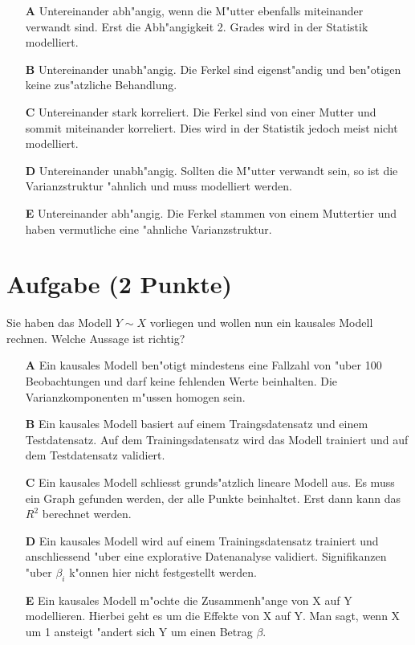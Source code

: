 \documentclass[a4paper, 9pt]{scrartcl}\usepackage[]{graphicx}\usepackage[]{xcolor}
\begin{document}
\begin{enumerate}
\item [\textbf{A} \msquare] Untereinander abh{"a}ngig, wenn die M{"u}tter ebenfalls miteinander verwandt sind. Erst die Abh{"a}ngigkeit 2. Grades wird in der Statistik modelliert.
\item [\textbf{B} \msquare] Untereinander unabh{"a}ngig. Die Ferkel sind eigenst{"a}ndig und ben{"o}tigen keine zus{"a}tzliche Behandlung.
\item [\textbf{C} \msquare] Untereinander stark korreliert. Die Ferkel sind von einer Mutter und sommit miteinander korreliert. Dies wird in der Statistik jedoch meist nicht modelliert.
\item [\textbf{D} \msquare] Untereinander unabh{"a}ngig. Sollten die M{"u}tter verwandt sein, so ist die Varianzstruktur {"a}hnlich und muss modelliert werden.
\item [\textbf{E} \msquare] Untereinander abh{"a}ngig. Die Ferkel stammen von einem Muttertier und haben vermutliche eine {"a}hnliche Varianzstruktur.
\end{enumerate}

\section{Aufgabe \hfill (2 Punkte)}




Sie haben das Modell $Y \sim X$ vorliegen und wollen nun ein
kausales Modell rechnen. Welche Aussage ist richtig?



\begin{enumerate}
\item [\textbf{A} \msquare] Ein kausales Modell ben{"o}tigt mindestens eine Fallzahl von {"u}ber 100 Beobachtungen und darf keine fehlenden Werte beinhalten. Die Varianzkomponenten m{"u}ssen homogen sein.
\item [\textbf{B} \msquare] Ein kausales Modell basiert auf einem Traingsdatensatz und einem Testdatensatz. Auf dem Trainingsdatensatz wird das Modell trainiert und auf dem Testdatensatz validiert.
\item [\textbf{C} \msquare] Ein kausales Modell schliesst grunds{"a}tzlich lineare Modell aus. Es muss ein Graph gefunden werden, der alle Punkte beinhaltet. Erst dann kann das $R^2$ berechnet werden.
\item [\textbf{D} \msquare] Ein kausales Modell wird auf einem Trainingsdatensatz trainiert und anschliessend {"u}ber eine explorative Datenanalyse validiert. Signifikanzen {"u}ber $\beta_i$ k{"o}nnen hier nicht festgestellt werden.
\item [\textbf{E} \msquare] Ein kausales Modell m{"o}chte die Zusammenh{"a}nge von X auf Y modellieren. Hierbei geht es um die Effekte von X auf Y. Man sagt, wenn X um 1 ansteigt {"a}ndert sich Y um einen Betrag $\beta$.
\end{enumerate}
\end{document}
